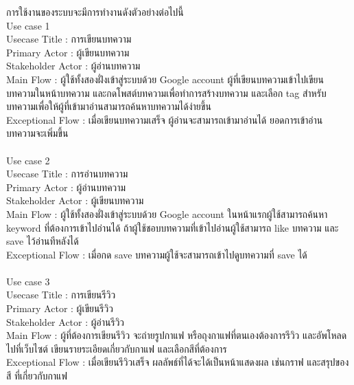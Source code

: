 การใช้งานของระบบจะมีการทำงานดังตัวอย่างต่อไปนี้ \\ 
Use case 1 \\ 
Usecase Title : การเขียนบทความ\\
Primary Actor : ผู้เขียนบทความ\\
Stakeholder Actor : ผู้อ่านบทความ\\
Main Flow : ผู้ใช้ทั้งสองฝั่งเข้าสู่ระบบด้วย Google account ผู้ที่เขียนบทความเข้าไปเขียนบทความในหน้าบทความ และกดโพสต์บทความเพื่อทำการสร้างบทความ และเลือก tag สำหรับบทความเพื่อให้ผู้ที่เข้ามาอ่านสามารถค้นหาบทความได้ง่ายขึ้น\\
Exceptional Flow : เมื่อเขียนบทความเสร็จ ผู้อ่านจะสามารถเข้ามาอ่านได้ ยอดการเข้าอ่านบทความจะเพิ่มขึ้น\\ \\
Use case 2 \\
Usecase Title : การอ่านบทความ\\
Primary Actor : ผู้อ่านบทความ\\
 Stakeholder Actor : ผู้เขียนบทความ\\
Main Flow : ผู้ใช้ทั้งสองฝั่งเข้าสู่ระบบด้วย Google account ในหน้าแรกผู้ใช้สามารถค้นหา keyword ที่ต้องการเข้าไปอ่านได้ ถ้าผู้ใช้ชอบบทความที่เข้าไปอ่านผู้ใช้สามารถ like บทความ และ save ไว้อ่านทีหลังได้\\
 Exceptional Flow : เมื่อกด save บทความผู้ใช้จะสามารถเข้าไปดูบทความที่ save ได้\\ \\
Use case 3\\
Usecase Title : การเขียนรีวิว\\
Primary Actor : ผู้เขียนรีวิว\\
 Stakeholder Actor : ผู้อ่านรีวิว\\
Main Flow : ผู้ที่ต้องการเขียนรีวิว จะถ่ายรูปกาแฟ หรือถุงกาแฟที่ตนเองต้องการรีวิว และอัพโหลดไปที่เว็บไซต์ เขียนรายระเอียดเกี่ยวกับกาแฟ และเลือกสีที่ต้องการ \\
 Exceptional Flow : เมื่อเขียนรีวิวเสร็จ ผลลัพธ์ที่ได้จะได้เป็นหน้าแสดงผล เช่นกราฟ และสรุปของสี ที่เกี่ยวกับกาแฟ\\

